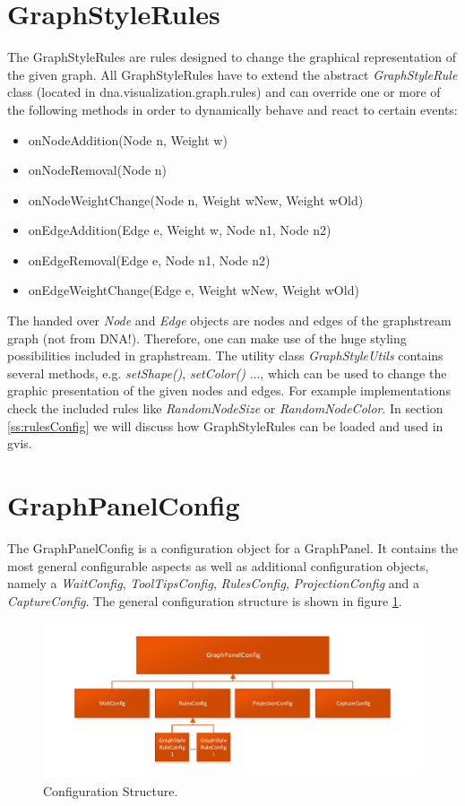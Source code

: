 \section{GraphStyleRules}
\label{s:graphStyleRules}
The GraphStyleRules are rules designed to change the graphical representation of the given graph. All GraphStyleRules have to extend the abstract \emph{GraphStyleRule} class (located in dna.visualization.graph.rules) and can override one or more of the following methods in order to dynamically behave and react to certain events:
\begin{itemize}
\item onNodeAddition(Node n, Weight w)
\item onNodeRemoval(Node n)
\item onNodeWeightChange(Node n, Weight wNew, Weight wOld)
\item onEdgeAddition(Edge e, Weight w, Node n1, Node n2)
\item onEdgeRemoval(Edge e, Node n1, Node n2)
\item onEdgeWeightChange(Edge e, Weight wNew, Weight wOld)
\end{itemize}
The handed over \emph{Node} and \emph{Edge} objects are nodes and edges of the graphstream graph (not from DNA!). Therefore, one can make use of the huge styling possibilities included in graphstream. The utility class \emph{GraphStyleUtils} contains several methods, e.g. \emph{setShape()}, \emph{setColor()} ..., which can be used to change the graphic presentation of the given nodes and edges. For example implementations check the included rules like \emph{RandomNodeSize} or \emph{RandomNodeColor}. In section \ref{ss:rulesConfig} we will discuss how GraphStyleRules can be loaded and used in gvis.


\section{GraphPanelConfig}
The GraphPanelConfig is a configuration object for a GraphPanel. It contains the most general configurable aspects as well as additional configuration objects, namely a \emph{WaitConfig}, \emph{ToolTipsConfig}, \emph{RulesConfig}, \emph{ProjectionConfig} and a \emph{CaptureConfig}. The general configuration structure is shown in figure \ref{fig:configstruct}.

\begin{figure} [h]
\centering
\includegraphics [scale=0.85] {images/configstruct.pdf}
\caption{Configuration Structure.}
\label{fig:configstruct}
\end{figure}

